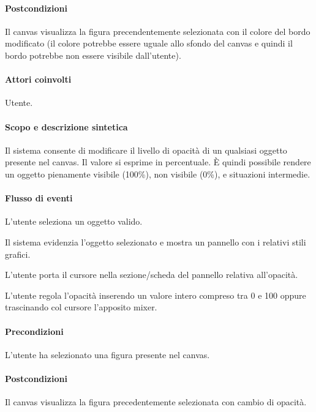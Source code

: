 \paragraph{Postcondizioni} Il canvas visualizza la figura precendentemente selezionata con il colore del bordo modificato (il colore potrebbe essere uguale allo sfondo del canvas e quindi il bordo potrebbe non essere visibile dall'utente).


\paragraph{Attori coinvolti} Utente.
\paragraph{Scopo e descrizione sintetica}  Il sistema consente di modificare il livello di opacit\` a di un qualsiasi oggetto presente nel canvas. Il valore si esprime in percentuale.   \` E quindi possibile rendere un oggetto pienamente visibile (100\%), non visibile (0\%), e situazioni intermedie.
\paragraph{Flusso di eventi}
\begin{elenconumerato}[\textbf{}]{\subsubsecindent}
\item L'utente seleziona un oggetto valido.
\item Il sistema evidenzia l'oggetto selezionato e mostra un pannello con i relativi stili grafici.
\item L'utente porta  il cursore nella sezione/scheda del pannello relativa all'opacit\` a.
\item L'utente regola l'opacit\` a inserendo un valore intero compreso tra 0 e 100 oppure trascinando col cursore l'apposito mixer.
\end{elenconumerato}
\paragraph{Precondizioni} L'utente ha selezionato una figura presente nel canvas.
\paragraph{Postcondizioni} Il canvas visualizza la figura precedentemente selezionata con cambio di opacit\` a.

